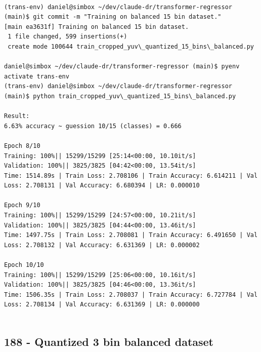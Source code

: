 \begin{verbatim}

(trans-env) daniel@simbox ~/dev/claude-dr/transformer-regressor (main)$ git commit -m "Training on balanced 15 bin dataset."
[main ea3631f] Training on balanced 15 bin dataset.
 1 file changed, 599 insertions(+)
 create mode 100644 train_cropped_yuv\_quantized_15_bins\_balanced.py

daniel@simbox ~/dev/claude-dr/transformer-regressor (main)$ pyenv activate trans-env 
(trans-env) daniel@simbox ~/dev/claude-dr/transformer-regressor (main)$ python train_cropped_yuv\_quantized_15_bins\_balanced.py

Result: 
6.63% accuracy ~ guession 10/15 (classes) = 0.666

Epoch 8/10
Training: 100%|| 15299/15299 [25:14<00:00, 10.10it/s]
Validation: 100%|| 3825/3825 [04:42<00:00, 13.54it/s]
Time: 1514.89s | Train Loss: 2.708106 | Train Accuracy: 6.614211 | Val Loss: 2.708131 | Val Accuracy: 6.680394 | LR: 0.000010

Epoch 9/10
Training: 100%|| 15299/15299 [24:57<00:00, 10.21it/s]
Validation: 100%|| 3825/3825 [04:44<00:00, 13.46it/s]
Time: 1497.75s | Train Loss: 2.708081 | Train Accuracy: 6.491650 | Val Loss: 2.708132 | Val Accuracy: 6.631369 | LR: 0.000002

Epoch 10/10
Training: 100%|| 15299/15299 [25:06<00:00, 10.16it/s]
Validation: 100%|| 3825/3825 [04:46<00:00, 13.36it/s]
Time: 1506.35s | Train Loss: 2.708037 | Train Accuracy: 6.727784 | Val Loss: 2.708134 | Val Accuracy: 6.631369 | LR: 0.000000


\end{verbatim}

\subsection{188 - Quantized 3 bin balanced dataset}
\label{app_res:188}

